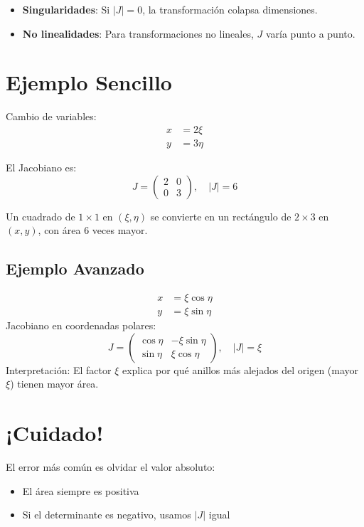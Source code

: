 \documentclass{article}
\begin{document}
\begin{minipage}{\dimexpr\textwidth-2\fboxsep}
\begin{itemize}
\item \textbf{Singularidades}: Si $|J| = 0$, la transformación colapsa dimensiones.
\item \textbf{No linealidades}: Para transformaciones no lineales, $J$ varía punto a punto.
\end{itemize}
\end{minipage}

\section{Ejemplo Sencillo}

Cambio de variables:
\begin{align*}
x &= 2\xi \\
y &= 3\eta
\end{align*}

El Jacobiano es:
\[
J = \begin{pmatrix}
2 & 0 \\
0 & 3
\end{pmatrix}, \quad |J| = 6
\]

Un cuadrado de $1 \times 1$ en $(\xi,\eta)$ se convierte en un rectángulo de $2 \times 3$ en $(x,y)$, con área 6 veces mayor.
\subsection{Ejemplo Avanzado}
\begin{minipage}{\dimexpr\textwidth-2\fboxsep}
\begin{align*}
x &= \xi\cos\eta \\
y &= \xi\sin\eta
\end{align*}
Jacobiano en coordenadas polares:
\[
J = \begin{pmatrix}
\cos\eta & -\xi\sin\eta \\
\sin\eta & \xi\cos\eta
\end{pmatrix}, \quad |J| = \xi
\]
Interpretación: El factor $\xi$ explica por qué anillos más alejados del origen (mayor $\xi$) tienen mayor área.
\end{minipage}


\section{¡Cuidado!}

El error más común es olvidar el valor absoluto:
\begin{itemize}
\item El área siempre es positiva
\item Si el determinante es negativo, usamos $|J|$ igual
\end{itemize}
\end{document}
